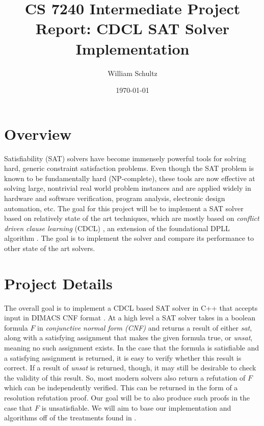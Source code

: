 \documentclass[12pt]{article}
\begin{document}
\title{CS 7240 Intermediate Project Report: CDCL SAT Solver Implementation}
\author{William Schultz}
\date{\today}

\maketitle

\section{Overview}

Satisfiability (SAT) solvers have become immensely powerful tools for solving hard, generic constraint satisfaction problems. Even though the SAT problem is known to be fundamentally hard (NP-complete), these tools are now effective at solving large, nontrivial real world problem instances and are applied widely in hardware and software verification, program analysis, electronic design automation, etc. The goal for this project will be to implement a SAT solver based on relatively state of the art techniques, which are mostly based on \textit{conflict driven clause learning} (CDCL) \cite{09bieresathandbook, bierecdcl,96sakallah}, an extension of the foundational DPLL algorithm \cite{1960dpll}. The goal is to implement the solver and compare its performance to other state of the art solvers.

\section{Project Details}

The overall goal is to implement a CDCL based  SAT solver in C++ that accepts input in DIMACS CNF format \cite{dimacsCNF}. At a high level a SAT solver takes in a boolean formula $F$ in \textit{conjunctive normal form (CNF)} and returns a result of either \textit{sat}, along with a satisfying assignment that makes the given formula true, or \textit{unsat}, meaning no such assignment exists. In the case that the formula is satisfiable and a satisfying assignment is returned, it is easy to verify whether this result is correct. If a result of \textit{unsat} is returned, though, it may still be desirable to check the validity of this result. So, most modern solvers also return a refutation of $F$ which can be independently verified. This can be returned in the form of a resolution refutation \cite{2012benarilogic} proof. Our goal will be to also produce such proofs in the case that $F$ is unsatisfiable. We will aim to base our implementation and algorithms off of the treatments found in \cite{09bieresathandbook}.
\end{document}
